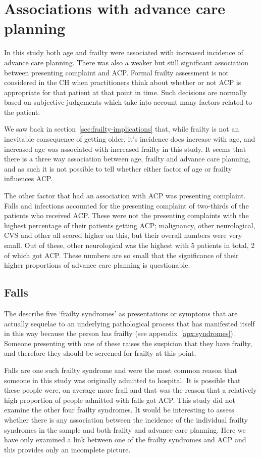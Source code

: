 \documentclass
[
	12pt,
	a4paper,
	oneside,
]{report}
\begin{document}
\section{Associations with advance care planning}

In this study both age and frailty were associated with increased incidence of
advance care planning. There was also a weaker but still significant association
between presenting complaint and ACP. Formal frailty assessment is not 
considered in the CH when practitioners think about whether or not ACP is 
appropriate for that patient at that point in time. Such decisions are normally
based on subjective judgements which take into account many factors related to
the patient.

We saw back in 
section~\ref{sec:frailty-implications} that, while frailty is not an
inevitable consequence of getting older, it's incidence does increase with age,
and increased age was associated with increased frailty in this study. It seems
that there is a three way association between age, frailty and advance care 
planning, and as such it is not possible to tell whether either factor of 
age or frailty influences ACP. 

The other factor that had an association with ACP was presenting complaint.
Falls and infections accounted for the presenting complaint of two-thirds
of the patients who received ACP. These were not the presenting complaints
with the highest percentage of their patients getting ACP; malignancy, other
neurological, CVS and other all scored higher on this, but their overall numbers
were very small. Out of these, other neurological was the highest with 5 patients in 
total, 2 of which got ACP. These numbers are so small that the significance
of their higher proportions of advance care planning is questionable. 

\subsection{Falls}

The \textcite{bgs:14} describe five `frailty syndromes' as presentations or 
symptoms that are actually sequelae to an underlying pathological process
that has manifested itself in this way because the person has frailty
(see appendix~\ref{apx:syndromes}).
Someone presenting with one of these raises the suspicion that they have frailty,
and therefore they should be screened for frailty at this point.

Falls are one such frailty syndrome and were the most common reason that someone
in this study was originally admitted to hospital. It is possible that these
people were, on average more frail and that was the reason that a 
relatively high proportion of people admitted with falls got ACP.
This study did not examine the other four frailty syndromes. 
It would be interesting to assess whether there is 
any association between the incidence of the individual frailty syndromes 
in the sample and both frailty and advance care planning. Here we have only
examined a link between one of the frailty syndromes and ACP and this
provides only an incomplete picture.  
\end{document}
